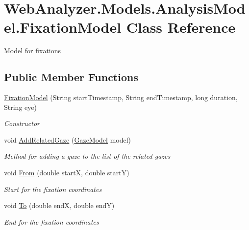 \hypertarget{class_web_analyzer_1_1_models_1_1_analysis_model_1_1_fixation_model}{}\section{Web\+Analyzer.\+Models.\+Analysis\+Model.\+Fixation\+Model Class Reference}
\label{class_web_analyzer_1_1_models_1_1_analysis_model_1_1_fixation_model}


Model for fixations  


\subsection*{Public Member Functions}
\begin{DoxyCompactItemize}
\item 
\hyperlink{class_web_analyzer_1_1_models_1_1_analysis_model_1_1_fixation_model_a462b5af1ba7cf2fd227cd570ced6a654}{Fixation\+Model} (String start\+Timestamp, String end\+Timestamp, long duration, String eye)
\begin{DoxyCompactList}\small\item\em Constructor \end{DoxyCompactList}\item 
void \hyperlink{class_web_analyzer_1_1_models_1_1_analysis_model_1_1_fixation_model_a8960e4d69b3c8782d89af1195220f911}{Add\+Related\+Gaze} (\hyperlink{class_web_analyzer_1_1_models_1_1_data_model_1_1_gaze_model}{Gaze\+Model} model)
\begin{DoxyCompactList}\small\item\em Method for adding a gaze to the list of the related gazes \end{DoxyCompactList}\item 
void \hyperlink{class_web_analyzer_1_1_models_1_1_analysis_model_1_1_fixation_model_aa11ed7734ed0da8d4bbb86b89a986a75}{From} (double start\+X, double start\+Y)
\begin{DoxyCompactList}\small\item\em Start for the fixation coordinates \end{DoxyCompactList}\item 
void \hyperlink{class_web_analyzer_1_1_models_1_1_analysis_model_1_1_fixation_model_a3a34442019813f39e6acbbb881017808}{To} (double end\+X, double end\+Y)
\begin{DoxyCompactList}\small\item\em End for the fixation coordinates \end{DoxyCompactList}\item 

\end{DoxyCompactItemize}
